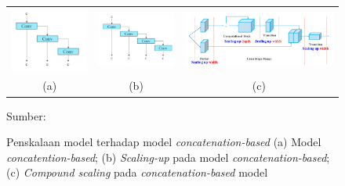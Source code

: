     \begin{figure}[H]
        \centering
        \begin{tabular}{ccc}
            \includegraphics[width=3cm]{../img/Compound Scaling Concatenation-Based Model - Latex.PNG}
            &
            \includegraphics[width=3cm]{../img/Compound Scaling Scaled Up - Latex.PNG}
            &
            \includegraphics[width=6cm]{../img/Compound Scaling Up Depth and Width - Latex.PNG}\\
            (a) &(b) &(c)\\
        \end{tabular}
        \caption{Penskalaan model terhadap model \textit{concatenation-based} (a) Model \textit{concatention-based}; (b) \textit{Scaling-up} pada model \textit{concatenation-based}; (c) \textit{Compound scaling} pada \textit{concatenation-based} model}
        \label{fig:compound-scaling}
        Sumber: \citep{Wang2022}
    \end{figure}

